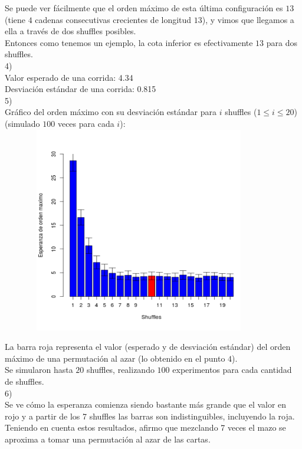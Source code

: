 \documentclass[a4paper]{article}
\begin{document}
Se puede ver fácilmente que el orden máximo de esta última configuración es $13$ (tiene $4$ cadenas consecutivas crecientes de longitud $13$), y vimos que llegamos a ella a través de dos shuffles posibles.\\

Entonces como tenemos un ejemplo, la cota inferior es efectivamente $13$ para dos shuffles.\\

4)\\
Valor esperado de una corrida: 4.34\\
Desviación estándar de una corrida: 0.815\\

5)\\
Gráfico del orden máximo con su desviación estándar para $i$ shuffles ($1 \leq i \leq 20$) (simulado $100$ veces para cada $i$):\\

\includegraphics[width=12cm,height=9cm,keepaspectratio]{grafico.png}


La barra roja representa el valor (esperado y de desviación estándar) del orden máximo de una permutación al azar (lo obtenido en el punto $4$).\\

Se simularon hasta $20$ shuffles, realizando $100$ experimentos para cada cantidad de shuffles.\\

6)\\
Se ve cómo la esperanza comienza siendo bastante más grande que el valor en rojo y a partir de los 7 shuffles las barras son indistinguibles, incluyendo la roja. Teniendo en cuenta estos resultados, afirmo que mezclando 7 veces el mazo se aproxima a tomar una permutación al azar de las cartas.\\
\end{document}
